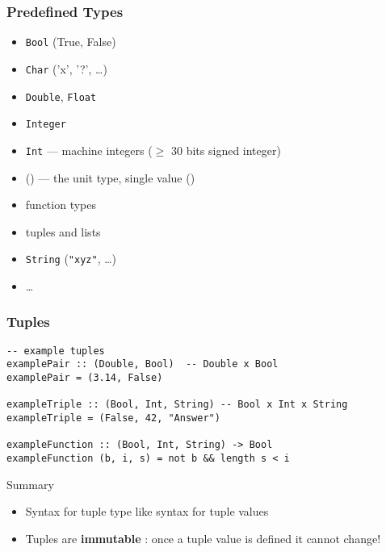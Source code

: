\documentclass{beamer}
\subtitle{Types}
\begin{document}
\begin{frame}
  \titlepage
\end{frame}
\begin{frame}[fragile]
  \frametitle{Predefined Types}
  \begin{itemize}
  \item \texttt{Bool} (True, False)
  \item  \texttt{Char} ('x', '?', \dots)
  \item \texttt{Double}, \texttt{Float} 
  \item   \texttt{Integer}
  \item  \texttt{Int} --- machine integers ($\ge$ 30 bits signed
    integer)
  \item  ()
    --- the unit type, single value () 
  \item  function types
  \item tuples and lists
  \item \texttt{String} (\verb|"xyz"|, \dots)  
  \item \dots
  \end{itemize}
\end{frame}
\begin{frame}[fragile]
  \frametitle{Tuples}
  \begin{block}{}
\begin{verbatim}
-- example tuples
examplePair :: (Double, Bool)  -- Double x Bool
examplePair = (3.14, False)

exampleTriple :: (Bool, Int, String) -- Bool x Int x String
exampleTriple = (False, 42, "Answer")

exampleFunction :: (Bool, Int, String) -> Bool
exampleFunction (b, i, s) = not b && length s < i
\end{verbatim}
  \end{block}
  \begin{alertblock}{Summary}
    \begin{itemize}
    \item Syntax for tuple type like syntax for tuple values
    \item Tuples are \textbf{immutable} : once a tuple value is defined it cannot change!
    \end{itemize}
  \end{alertblock}
\end{frame}
\end{document}
